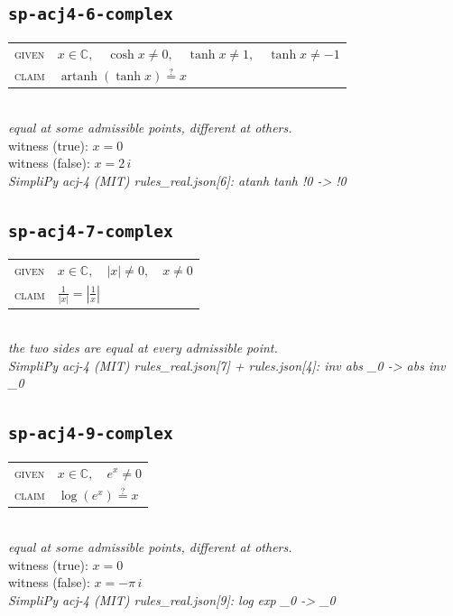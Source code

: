 \documentclass[11pt]{article}
\begin{document}
\subsection*{\texttt{sp-acj4-6-complex}}
\begin{tabular}{@{}l@{\quad}l@{}}
\textsc{given} & $x \in \mathbb{C},\quad \cosh x \neq 0,\quad \tanh x \neq 1,\quad \tanh x \neq -1$ \\[4pt]
\textsc{claim} & $\displaystyle \operatorname{artanh}\left(\tanh x\right) \overset{?}{=} x$ \\
\end{tabular}\\[2pt]
{\small\emph{equal at some admissible points, different at others.}}\\
{\footnotesize\color{gray}witness (true): $x = 0$}\\
{\footnotesize\color{gray}witness (false): $x = 2 \, i$}\\
\emph{SimpliPy acj-4 (MIT) rules\_real.json[6]: atanh tanh !0  ->  !0}\\

\subsection*{\texttt{sp-acj4-7-complex}}
\begin{tabular}{@{}l@{\quad}l@{}}
\textsc{given} & $x \in \mathbb{C},\quad \left|x\right| \neq 0,\quad x \neq 0$ \\[4pt]
\textsc{claim} & $\displaystyle \frac{1}{\left|x\right|} = \left|\frac{1}{x}\right|$ \\
\end{tabular}\\[2pt]
{\small\emph{the two sides are equal at every admissible point.}}\\
\emph{SimpliPy acj-4 (MIT) rules\_real.json[7] + rules.json[4]: inv abs \_0  ->  abs inv \_0}\\

\subsection*{\texttt{sp-acj4-9-complex}}
\begin{tabular}{@{}l@{\quad}l@{}}
\textsc{given} & $x \in \mathbb{C},\quad e^{x} \neq 0$ \\[4pt]
\textsc{claim} & $\displaystyle \log\left(e^{x}\right) \overset{?}{=} x$ \\
\end{tabular}\\[2pt]
{\small\emph{equal at some admissible points, different at others.}}\\
{\footnotesize\color{gray}witness (true): $x = 0$}\\
{\footnotesize\color{gray}witness (false): $x = -\pi \, i$}\\
\emph{SimpliPy acj-4 (MIT) rules\_real.json[9]: log exp \_0  ->  \_0}\\
\end{document}
